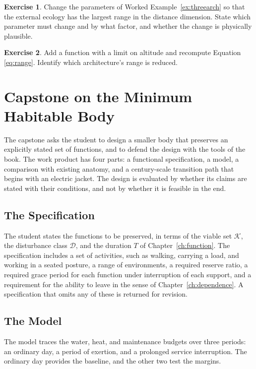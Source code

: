 \documentclass[11pt,openany]{book}
\theoremstyle{definition}
\newtheorem{exercise}{Exercise}[chapter]
\theoremstyle{remark}
\newcommand{\Kset}{\mathcal{K}}
\newcommand{\Dset}{\mathcal{D}}
\begin{document}
\begin{exercise}
Change the parameters of Worked Example~\ref{ex:threearch} so that the external ecology has the largest range in the distance dimension. State which parameter must change and by what factor, and whether the change is physically plausible.
\end{exercise}

\begin{exercise}
Add a function with a limit on altitude and recompute Equation \eqref{eq:range}. Identify which architecture's range is reduced.
\end{exercise}

\chapter{Capstone on the Minimum Habitable Body}
\label{ch:capstone}

The capstone asks the student to design a smaller body that preserves an explicitly stated set of functions, and to defend the design with the tools of the book. The work product has four parts: a functional specification, a model, a comparison with existing anatomy, and a century-scale transition path that begins with an electric jacket. The design is evaluated by whether its claims are stated with their conditions, and not by whether it is feasible in the end.

\section{The Specification}

The student states the functions to be preserved, in terms of the viable set $\Kset$, the disturbance class $\Dset$, and the duration $T$ of Chapter~\ref{ch:function}. The specification includes a set of activities, such as walking, carrying a load, and working in a seated posture, a range of environments, a required reserve ratio, a required grace period for each function under interruption of each support, and a requirement for the ability to leave in the sense of Chapter~\ref{ch:dependence}. A specification that omits any of these is returned for revision.

\section{The Model}

The model traces the water, heat, and maintenance budgets over three periods: an ordinary day, a period of exertion, and a prolonged service interruption. The ordinary day provides the baseline, and the other two test the margins.
\end{document}
